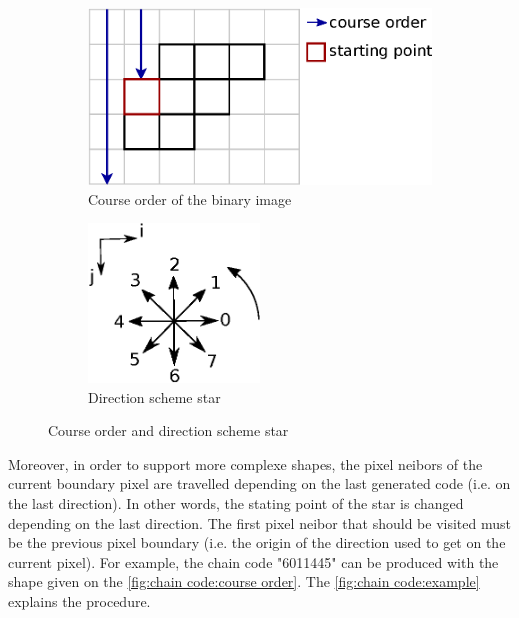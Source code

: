 \begin{figure}[h]
	\centering
	
  	\begin{subfigure}[b]{0.5\textwidth}
    	\includegraphics[width=\textwidth]{images/chain_code/course_order}
		\caption{Course order of the binary image \cite{bib:chain:ParametreGeometriqueChaineFreeman}}
		\label{fig:chain code:course order}	
  	\end{subfigure}
  	\begin{subfigure}[b]{0.4\textwidth}
  		\centering
    	\includegraphics[width=0.5\textwidth]{images/chain_code/direction_scheme_star}
    	\caption{Direction scheme star \cite{bib:chain:ParametreGeometriqueChaineFreeman}}
		\label{fig:chain code:direction scheme star}
  	\end{subfigure}
	
	\caption{Course order and direction scheme star}
\end{figure}




Moreover, in order to support more complexe shapes, the pixel neibors of the current boundary pixel are travelled depending on the last generated code (i.e. on the last direction). In other words, the stating point of the star is changed depending on the last direction. The first pixel neibor that should be visited must be the previous pixel boundary (i.e. the origin of the direction used to get on the current pixel). For example, the chain code "6011445" can be produced with the shape given on the \vref{fig:chain code:course order}. The \vref{fig:chain code:example} explains the procedure. 

